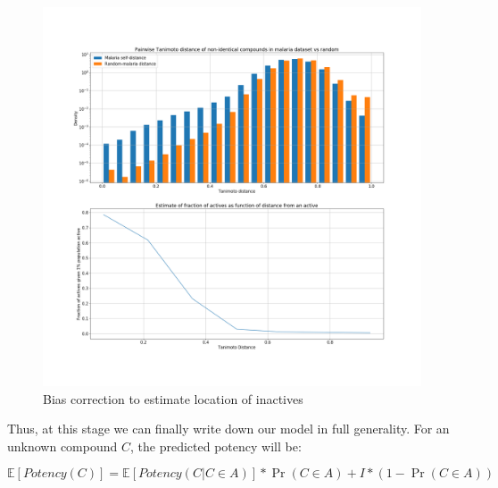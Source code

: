 \documentclass[journal=jacsat,manuscript=article]{achemso}
\begin{document}
\begin{figure}
    \centering
    \includegraphics[width=\textwidth]{fig5_bias_correction.png}
    \caption{Bias correction to estimate location of inactives}
    \label{fig:mal_cluster}
\end{figure}
\newline
\newline

Thus, at this stage we can finally write down our model in full generality. For an unknown compound $C$, the predicted potency will be:

\label{eq:full_modes}
\begin{equation}
    \mathbb{E}[Potency(C)] = \mathbb{E}[Potency(C | C \in A)] * \Pr(C \in A) + I * (1-\Pr(C \in A))   
    \label{eq:full_model}
\end{equation}
\end{document}

